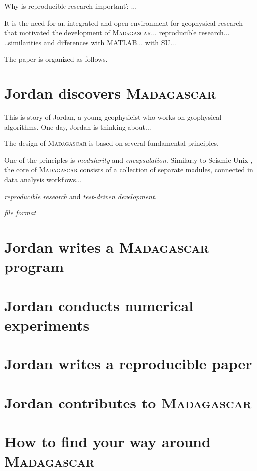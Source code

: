 Why is reproducible research important? ...

It is the need for an integrated and open environment for geophysical
research that motivated the development of
\textsc{Madagascar}... reproducible research... ..similarities and
differences with MATLAB... with SU...

The paper is organized as follows. 

\section{Jordan discovers \textsc{Madagascar}}

This is story of Jordan, a young geophysicist who works on geophysical
algorithms. One day, Jordan is thinking about...

The design of \textsc{Madagascar} is based on several fundamental
principles. 

One of the principles is \emph{modularity} and
\emph{encapsulation}. Similarly to Seismic Unix \cite[]{TLE16-07-10451049},
the core of \textsc{Madagascar} consists of a collection of separate
modules, connected in data analysis workflows...

\emph{reproducible research} and \emph{test-driven development}.

\emph{file format} 

\section{Jordan writes a \textsc{Madagascar} program}

\section{Jordan conducts numerical experiments}

\section{Jordan writes a reproducible paper}

\section{Jordan contributes to \textsc{Madagascar}}

\section{How to find your way around \textsc{Madagascar}}

